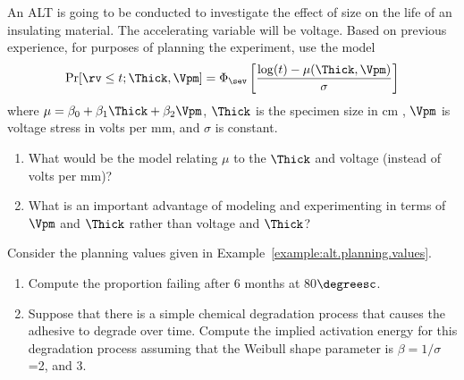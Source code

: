 \begin{exercise}
An ALT is going to be conducted to investigate the
effect of size on the life of an insulating material. The accelerating
variable will be voltage.
Based on previous experience, for purposes of
planning
the experiment, use the model
\begin{displaymath}
\Pr[\rv \leq t;\Thick,\Vpm] = \Phi_{\sev} 
\left[\frac{\log(t)-\mu(\Thick,\Vpm)}{\sigma} \right]
\end{displaymath}
where 
$\mu = \beta_{0}+ \beta_{1} \Thick + \beta_{2} \Vpm$,
$\Thick$ is the specimen size in cm , $\Vpm$ is voltage stress in
volts per mm, and $\sigma$ is constant.
\begin{enumerate}
\item
What would be the model relating $\mu$ to the $\Thick$ and voltage (instead
of volts per mm)?
\item
What is an important advantage of modeling and experimenting in terms
of
$\Vpm$ and $\Thick$ rather than voltage and $\Thick$?
\end{enumerate}
\end{exercise}

\begin{exercise}
Consider the planning values given in
Example~\ref{example:alt.planning.values}.
\begin{enumerate}
\item
Compute the proportion failing after 6 months at 80$\degreesc$.
\item
Suppose that there is a simple chemical degradation process that causes
the adhesive to degrade over time.
Compute the implied
activation energy for this degradation process assuming that the
Weibull shape parameter is $\beta=1/\sigma$=2, and 3.
\end{enumerate}
\end{exercise}

